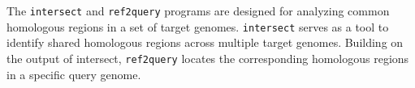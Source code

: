 The \texttt{intersect} and \texttt{ref2query} programs are designed
for analyzing common homologous regions in a set of target
genomes. \texttt{intersect} serves as a tool to identify shared
homologous regions across multiple target genomes. Building on the
output of intersect, \texttt{ref2query} locates the corresponding
homologous regions in a specific query genome.
